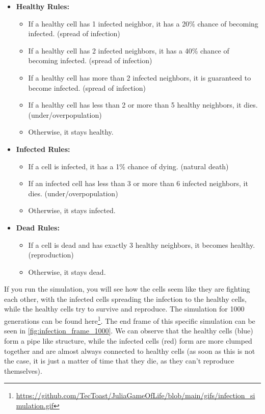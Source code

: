 \documentclass[a4paper,12pt]{llncs}
\numberwithin{equation}{section}
\begin{document}
\begin{itemize}
  \item \textbf{Healthy Rules:}
        \begin{itemize}
          \item If a healthy cell has 1 infected neighbor, it has a 20\% chance of becoming infected. (spread of infection)
          \item If a healthy cell has 2 infected neighbors, it has a 40\% chance of becoming infected. (spread of infection)
          \item If a healthy cell has more than 2 infected neighbors, it is guaranteed to become infected. (spread of infection)
          \item If a healthy cell has less than 2 or more than 5 healthy neighbors, it dies. (under/overpopulation)
          \item Otherwise, it stays healthy.
        \end{itemize}
  \item \textbf{Infected Rules:}
        \begin{itemize}
          \item If a cell is infected, it has a 1\% chance of dying. (natural death)
          \item If an infected cell has less than 3 or more than 6 infected neighbors, it dies. (under/overpopulation)
          \item Otherwise, it stays infected.
        \end{itemize}
  \item \textbf{Dead Rules:}
        \begin{itemize}
          \item If a cell is dead and has exactly 3 healthy neighbors, it becomes healthy. (reproduction)
          \item Otherwise, it stays dead.
        \end{itemize}
\end{itemize}
If you run the simulation, you will see how the cells seem like they are fighting each other, with the infected cells spreading the infection to the healthy cells, while the healthy cells try to survive and reproduce.
The simulation for 1000 generations can be found here\footnote{\url{https://github.com/TecToast/JuliaGameOfLife/blob/main/gifs/infection_simulation.gif}}. The end frame of this specific simulation can be seen in \autoref{fig:infection_frame_1000}.
We can observe that the healthy cells (blue) form a pipe like structure, while the infected cells (red) form are more clumped together and are almost always connected to healthy cells (as soon as this is not the case, it is just a matter of time that they die, as they can't reproduce themselves).
\end{document}
